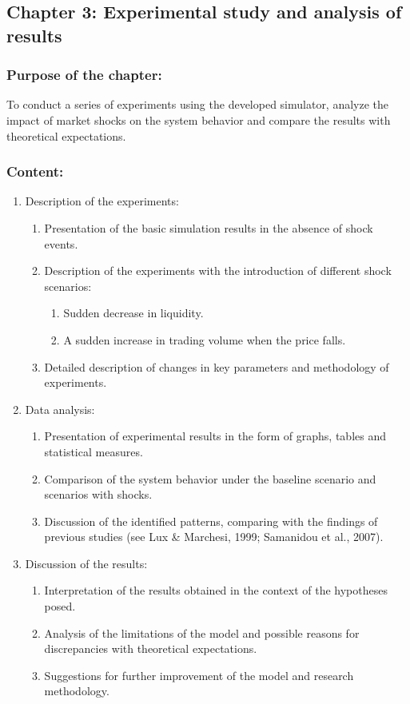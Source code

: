 \subsection{Chapter 3: Experimental study and analysis of results}

\subsubsection{Purpose of the chapter:}

To conduct a series of experiments using the developed simulator, analyze the impact of market shocks on the system behavior and compare the results with theoretical expectations.

\subsubsection{Content:}

\begin{enumerate}
    \item Description of the experiments:
    \begin{enumerate}
        \item Presentation of the basic simulation results in the absence of shock events.
        \item Description of the experiments with the introduction of different shock scenarios:
        \begin{enumerate}
            \item Sudden decrease in liquidity.
            \item A sudden increase in trading volume when the price falls.
        \end{enumerate}
        \item Detailed description of changes in key parameters and methodology of experiments.
    \end{enumerate}
    \item Data analysis:
    \begin{enumerate}
        \item Presentation of experimental results in the form of graphs, tables and statistical measures.
        \item Comparison of the system behavior under the baseline scenario and scenarios with shocks.
        \item Discussion of the identified patterns, comparing with the findings of previous studies (see Lux & Marchesi, 1999; Samanidou et al., 2007).
    \end{enumerate}
    \item Discussion of the results:
    \begin{enumerate}
        \item Interpretation of the results obtained in the context of the hypotheses posed.
        \item Analysis of the limitations of the model and possible reasons for discrepancies with theoretical expectations.
        \item Suggestions for further improvement of the model and research methodology.
    \end{enumerate}
\end{enumerate}

